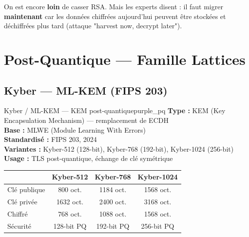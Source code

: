 \documentclass[12pt, a4paper]{article}
\begin{document}
\begin{attention}
On est encore \textbf{loin} de casser RSA. Mais les experts disent : il faut migrer
\textbf{maintenant} car les données chiffrées aujourd'hui peuvent être stockées et
déchiffrées plus tard (attaque "harvest now, decrypt later").
\end{attention}

\section{Post-Quantique --- Famille Lattices}

\subsection{Kyber --- ML-KEM (FIPS 203)}

\begin{algobox}{Kyber / ML-KEM --- KEM post-quantique}{purple_pq}
\textbf{Type :} KEM (Key Encapsulation Mechanism) --- remplacement de ECDH\\
\textbf{Base :} MLWE (Module Learning With Errors)\\
\textbf{Standardisé :} FIPS 203, 2024\\
\textbf{Variantes :} Kyber-512 (128-bit), Kyber-768 (192-bit), Kyber-1024 (256-bit)\\
\textbf{Usage :} TLS post-quantique, échange de clé symétrique
\end{algobox}

\begin{center}
\renewcommand{\arraystretch}{1.4}
\begin{tabular}{lccc}
  \toprule
  & \textbf{Kyber-512} & \textbf{Kyber-768} & \textbf{Kyber-1024} \\
  \midrule
  Clé publique & 800 oct. & 1184 oct. & 1568 oct. \\
  Clé privée & 1632 oct. & 2400 oct. & 3168 oct. \\
  Chiffré & 768 oct. & 1088 oct. & 1568 oct. \\
  Sécurité & 128-bit PQ & 192-bit PQ & 256-bit PQ \\
  \bottomrule
\end{tabular}
\end{center}
\end{document}
